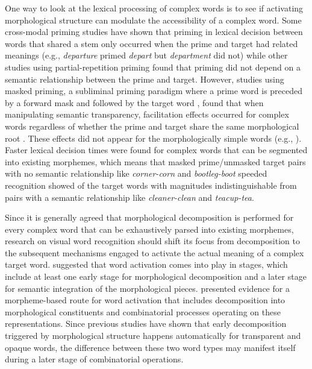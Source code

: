 \documentclass{frontiersSCNS}
\begin{document}
	One way to look at the lexical processing of complex words is to see if activating morphological structure can modulate the accessibility of a complex word. Some cross-modal priming studies \citep{Marslen-Wilson:1994} have shown that priming in lexical decision between words that shared a stem only occurred when the prime and target had related meanings (e.g., \textit{departure} primed \textit{depart} but \textit{department} did not) while other studies \citep*{Zwitserlood:1994} using partial-repetition priming found that priming did not depend on a semantic relationship between the prime and target. However, studies using masked priming, a subliminal priming paradigm where a prime word is preceded by a forward mask and followed by the target word \citep*{Forster:1984}, found that when manipulating semantic transparency, facilitation effects occurred for complex words regardless of whether the prime and target share the same morphological root \citep*{Rastle:2004, Longtin:2003, Fiorentino:2007, McCormick:2008}. These effects did not appear for the morphologically simple words (e.g., ).  Faster lexical decision times were found for complex words that can be segmented into existing morphemes, which means that masked prime/unmasked target pairs with no semantic relationship like \textit{corner-corn} and \textit{bootleg-boot} speeded recognition showed of the target words with magnitudes indistinguishable from pairs with a semantic relationship like \textit{cleaner-clean} and \textit{teacup-tea}.

	Since it is generally agreed that morphological decomposition is performed for every complex word that can be exhaustively parsed into existing morphemes, research on visual word recognition should shift its focus from decomposition to the subsequent mechanisms engaged to activate the actual meaning of a complex target word.  \citet*{Meunier:2007} suggested that word activation comes into play in stages, which include at least one early stage for morphological decomposition and a later stage for semantic integration of the morphological pieces. \citet{Fiorentino:2013} presented evidence for a morpheme-based route for word activation that includes decomposition into morphological constituents and combinatorial processes operating on these representations.  Since previous studies have shown that early decomposition triggered by morphological structure happens automatically for transparent and opaque words, the difference between these two word types may manifest itself during a later stage of combinatorial operations.
\end{document}
